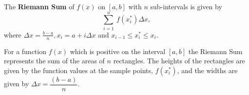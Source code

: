 \documentclass[handout]{ximera}
\begin{document}

\begin{definition}
The \textbf{Riemann Sum} of $f(x)$ on $[a,b]$ with $n$ sub-intervals is given by 
\[\sum_{i = 1}^n \ f(x_i^*) \Delta x,\]
where $\Delta x = \frac{b-a}{n}, x_i = a + i\Delta x$ and $x_{i-1} \leq x_i^* \leq x_i$.  
\end{definition}

\begin{remark}
For a function $f(x)$ which is positive on the interval $[a,b]$
the Riemann Sum represents the sum of the areas of $n$ rectangles.  
The heights of the rectangles are given by the function values at the sample 
points, $f(x_i^*)$, and the widths are given by $\Delta x = \dfrac{(b-a)}{n}$.
\end{remark}













\end{document}
